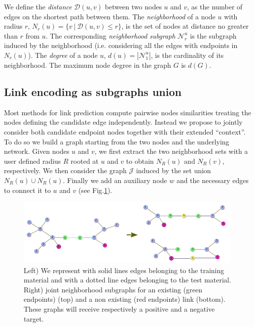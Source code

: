 \documentclass[runningheads,a4paper]{llncs}
\begin{document}
We define the \textit{distance} $\mathcal{D}(u,v)$ between two nodes $u$ and $v$, as the number of edges on the shortest path between them. The \textit{neighborhood} of a node $u$ with radius $r$, $N_r(u) = \lbrace v\ |\ \mathcal{D}(u,v) \leq r \rbrace$, is the set of nodes at distance no greater than $r$ from $u$. The corresponding \textit{neighborhood subgraph} $\mathcal{N}_{r}^{u}$ is the  subgraph induced by the neighborhood (i.e. considering all the edges with endpoints in $N_r(u)$). The \textit{degree} of a node $u$, $d(u) = |\mathcal{N}_{1}^{u}|$, is the cardinality of its neighborhood. The maximum node degree in the graph $G$ is $d(G)$.



\subsection{Link encoding as subgraphs union}
\label{sec:link}
Most methods for link prediction compute pairwise nodes similarities treating  the nodes defining the candidate edge independently. Instead we propose to jointly consider both candidate endpoint nodes together with their extended ``context''. To do so we build a graph starting from the two nodes and the underlying network. Given nodes $u$ and $v$, we first extract the two neighborhood sets with a user defined radius $R$ rooted at $u$ and $v$ to obtain $N_R(u)$ and $N_R(v)$, respectively. We then consider the graph $\mathcal{J}$ induced by the set union $N_R(u) \cup N_R(u)$. Finally we add an auxiliary node $w$ and the necessary edges to connect it to $u$ and $v$ (see Fig.\ref{fig:example}).

\begin{figure}
\centering
\includegraphics[width=.9\textwidth]{subgraphs}
\caption{Left) We represent with solid lines edges belonging to the training material and with a dotted line edges belonging to the test material. Right) joint neighborhood subgraphs for an existing (green endpoints) (top) and a non existing (red endpoints) link (bottom). These graphs will receive respectively a positive and a negative target.}
\label{fig:example}
\end{figure}
\end{document}
